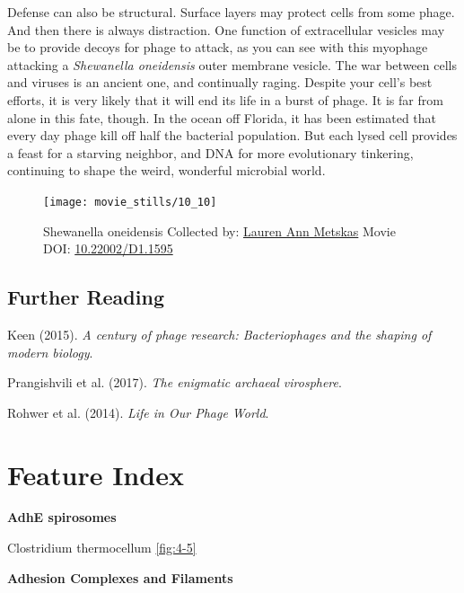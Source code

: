 \documentclass[]{tufte-book}
\begin{document}
Defense can also be structural. Surface layers may protect cells from
some phage. And then there is always distraction. One function of
extracellular vesicles may be to provide decoys for phage to attack, as
you can see with this myophage attacking a \emph{Shewanella oneidensis}
outer membrane vesicle. The war between cells and viruses is an ancient
one, and continually raging. Despite your cell's best efforts, it is
very likely that it will end its life in a burst of phage. It is far
from alone in this fate, though. In the ocean off Florida, it has been
estimated that every day phage kill off half the bacterial population.
But each lysed cell provides a feast for a starving neighbor, and DNA
for more evolutionary tinkering, continuing to shape the weird,
wonderful microbial world.





\begin{figure}
\texttt{[image: movie\_stills/10\_10]} \caption[Shewanella oneidensis Collected by:
\protect\hyperlink{lauren_ann_metskas}{Lauren Ann Metskas} Movie DOI:
\href{https://doi.org/10.22002/D1.1595}{10.22002/D1.1595}]{Shewanella oneidensis Collected by:
\protect\hyperlink{lauren_ann_metskas}{Lauren Ann Metskas} Movie DOI:
\href{https://doi.org/10.22002/D1.1595}{10.22002/D1.1595}}\label{fig:10-10}
\end{figure}

\section{Further Reading}\label{further-reading-9}

Keen (2015). \emph{A century of phage research: Bacteriophages and the
shaping of modern biology}.\citep{keen2015}

Prangishvili et al. (2017). \emph{The enigmatic archaeal
virosphere}.\citep{prangishvili2017}

Rohwer et al. (2014). \emph{Life in Our Phage World}.\citep{rohwer2014}

\appendix


\chapter{Feature Index}\label{feature-index}

\textbf{AdhE spirosomes}

Clostridium thermocellum \ref{fig:4-5}

\textbf{Adhesion Complexes and Filaments}
\end{document}
